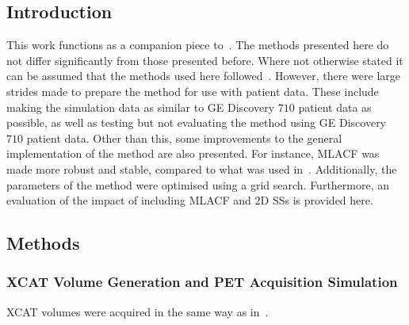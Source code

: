         \subsection{Introduction} \label{sec:evaluation_of_pet_ct_motion_correction_incorporating_motion_models_using_mlacf_and_complex_gating_schemes_introduction}
            This work functions as a companion piece to~. The methods presented here do not differ significantly from those presented before. Where not otherwise stated it can be assumed that the methods used here followed~. However, there were large strides made to prepare the method for use with patient data. These include making the simulation data as similar to \gls{GE} Discovery $710$ patient data as possible, as well as testing but not evaluating the method using \gls{GE} Discovery $710$ patient data. Other than this, some improvements to the general implementation of the method are also presented. For instance, \gls{MLACF} was made more robust and stable, compared to what was used in~. Additionally, the parameters of the method were optimised using a grid search. Furthermore, an evaluation of the impact of including \gls{MLACF} and \gls{2D} \glspl{SS} is provided here.
        
        \subsection{Methods} \label{sec:evaluation_of_pet_ct_motion_correction_incorporating_motion_models_using_mlacf_and_complex_gating_schemes_methods}
            
            
            \subsubsection{XCAT Volume Generation and PET Acquisition Simulation} \label{sec:evaluation_of_pet_ct_motion_correction_incorporating_motion_models_using_mlacf_and_complex_gating_schemes_methods_xcat_volume_generation_and_pet_acquisition_simulation}
                \gls{XCAT} volumes were acquired in the same way as in~.

